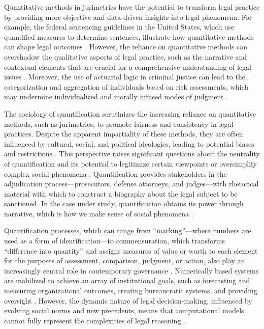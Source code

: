 Quantitative methods in jurimetrics have the potential to transform legal practice by providing more objective and data-driven insights into legal phenomena. For example, the federal sentencing guidelines in the United States, which use quantified measures to determine sentences, illustrate how quantitative methods can shape legal outcomes \cite{101111lsi12334}. However, the reliance on quantitative methods can overshadow the qualitative aspects of legal practice, such as the narrative and contextual elements that are crucial for a comprehensive understanding of legal issues \cite{101111lsi12334}. Moreover, the use of actuarial logic in criminal justice can lead to the categorization and aggregation of individuals based on risk assessments, which may undermine individualized and morally infused modes of judgment \cite{101111lsi12334}.

The sociology of quantification scrutinizes the increasing reliance on quantitative methods, such as jurimetrics, to promote fairness and consistency in legal practices. Despite the apparent impartiality of these methods, they are often influenced by cultural, social, and political ideologies, leading to potential biases and restrictions \cite{10.1057/s41599-020-00557-0, de2010jurimetrics, 10.1177/09596801221075807}. This perspective raises significant questions about the neutrality of quantification and its potential to legitimize certain viewpoints or oversimplify complex social phenomena \cite{10.1111/ilr.12067, 10.20396/rdbci.v18i0.8658889}. Quantification provides stakeholders in the adjudication process—prosecutors, defense attorneys, and judges—with rhetorical material with which to construct a biography about the legal subject to be sanctioned. In the case under study, quantification obtains its power through narrative, which is how we make sense of social phenomena \cite{10_1111_lsi_12334}.

Quantification processes, which can range from “marking”—where numbers are used as a form of identification—to commensuration, which transforms “difference into quantity” and assigns measures of value or worth to each element for the purposes of assessment, comparison, judgment, or action, also play an increasingly central role in contemporary governance \cite{10_1111_lsi_12334}. Numerically based systems are mobilized to achieve an array of institutional goals, such as forecasting and measuring organizational outcomes, creating bureaucratic systems, and providing oversight \cite{10_1111_lsi_12334}. However, the dynamic nature of legal decision-making, influenced by evolving social norms and new precedents, means that computational models cannot fully represent the complexities of legal reasoning \cite{10.1007/s11186-021-09453-1,zabala2019decades}.

